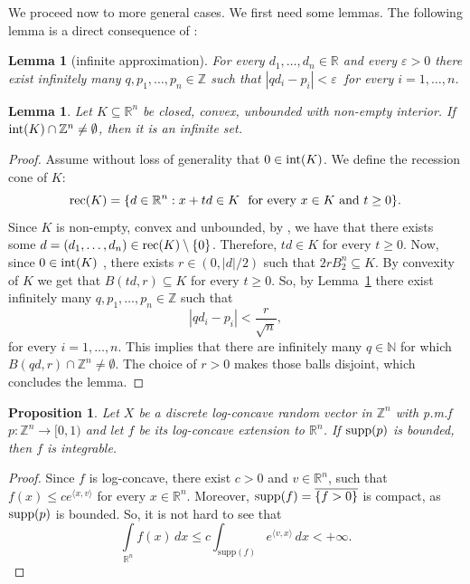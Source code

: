 \documentclass[11pt,a4paper]{article} %
\newtheorem{lemma}[theorem]{Lemma}
\newtheorem{proposition}[theorem]{Proposition}
\theoremstyle{definition}
\theoremstyle{remark}
\newcommand{\1}{\mathds{1}}
\begin{document}
We proceed now to more general cases. We first need some lemmas. The following lemma is a direct consequence of \cite[Theorem VII]{Cassels} :

\begin{lemma}[infinite approximation]\label{lem:dioph}
    For every $d_1,\ldots,d_n \in \mathbb{R}$ and every $\varepsilon>0$ there exist infinitely many $q,p_1,\ldots,p_n \in \mathbb{Z}$ such that $|qd_i-p_i| < \varepsilon \ $ for every $i=1,\ldots,n$.
\end{lemma}

\begin{lemma}\label{lem:infinite-lattice}
    Let $K \subseteq \mathbb{R}^n$ be closed, convex, unbounded with non-empty interior. If ${\rm int}(K) \cap \mathbb{Z}^n \neq \emptyset$, then it is an infinite set.
\end{lemma}

\begin{proof}
    Assume without loss of generality that $0 \in {\rm int}(K)$. We define the recession cone of $K$: $${\rm rec}(K)=\{ d \in \mathbb{R}^n: x+td \in K \ \text{ for every  } x \in K \text{ and } t \geq 0 \}. $$
    Since $K$ is non-empty, convex and unbounded, by \cite[Theorem 8.4]{Rock} , we have that there exists some $d=(d_1,\ldots,d_n) \in {\rm rec}(K) \setminus \{0\}$. Therefore, $td \in K$ for every $t \geq 0$.  Now, since $0 \in {\rm int}(K)$ , there exists $r \in (0,|d|/2)$ such that $2rB_2^n \subseteq K$. By convexity of $K$ we get that $B(td,r) \subseteq K$ for every $t \geq 0$. So, by Lemma~\ref{lem:dioph} there exist infinitely many $q,p_1,\ldots,p_n \in \mathbb{Z}$ such that
    $$ |qd_i-p_i| < \frac{r}{\sqrt{n}}, $$ for every $i=1,\ldots,n$. This implies that there are infinitely many $q \in \mathbb{N}$ for which $B(qd,r) \cap \mathbb{Z}^n \neq \emptyset$. The choice of $r>0$ makes those balls disjoint, which concludes the lemma.
\end{proof}


\begin{proposition}\label{prop:bounded}
Let $X$ be a discrete log-concave random vector in $\mathbb{Z}^n$ with p.m.f $p:\mathbb{Z}^n \to [0,1)$ and let $f$ be its log-concave extension to $\mathbb{R}^n$. If  ${\rm supp}(p)$ is bounded, then $f$ is integrable.
\end{proposition}

\begin{proof}
Since $f$ is log-concave, there exist $c>0$ and $v \in \mathbb{R}^n$, such that $f(x)\leq c e^{\langle x,v \rangle}$ for every $x \in \mathbb{R}^n$. Moreover,  ${\rm supp}(f)=\overline{\{f>0\}}$ is compact, as ${\rm supp}(p)$ is bounded. So, it is not hard to see that $$\int\limits_{\mathbb{R}^n} f(x) \, dx \leq c \int_{\mathrm{supp}(f)} e^{\langle v,x\rangle}\,dx < +\infty.$$
    
\end{proof}
\end{document}
